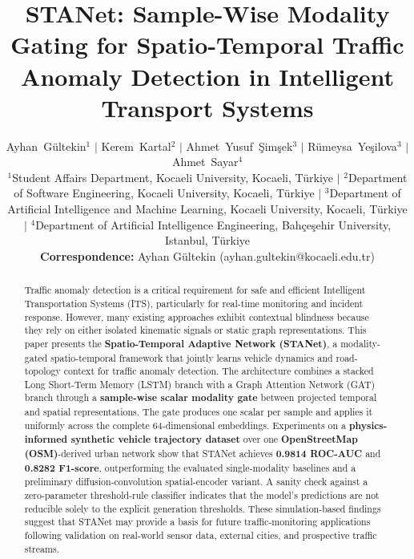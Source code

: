 \documentclass[journal]{IEEEtran}
\begin{document}
\raggedbottom

\title{STANet: Sample-Wise Modality Gating for Spatio-Temporal Traffic Anomaly Detection in Intelligent Transport Systems}

\author{
    Ayhan~Gültekin$^{1}$ $|$ Kerem~Kartal$^{2}$ $|$ Ahmet~Yusuf~Şimşek$^{3}$ $|$ Rümeysa~Yeşilova$^{3}$ $|$ Ahmet~Sayar$^{4}$ \\[2ex]
    \small
    $^{1}$Student Affairs Department, Kocaeli University, Kocaeli, Türkiye $|$
    $^{2}$Department of Software Engineering, Kocaeli University, Kocaeli, Türkiye $|$
    $^{3}$Department of Artificial Intelligence and Machine Learning, Kocaeli University, Kocaeli, Türkiye $|$
    $^{4}$Department of Artificial Intelligence Engineering, Bahçeşehir University, Istanbul, Türkiye \\[1.5ex]
    \textbf{Correspondence:} Ayhan Gültekin (ayhan.gultekin@kocaeli.edu.tr)
}

\maketitle

\begin{abstract}
  Traffic anomaly detection is a critical requirement for safe and efficient Intelligent Transportation Systems (ITS), particularly for real-time monitoring and incident response. However, many existing approaches exhibit contextual blindness because they rely on either isolated kinematic signals or static graph representations. This paper presents the \textbf{Spatio-Temporal Adaptive Network (STANet)}, a modality-gated spatio-temporal framework that jointly learns vehicle dynamics and road-topology context for traffic anomaly detection. The architecture combines a stacked Long Short-Term Memory (LSTM) branch with a Graph Attention Network (GAT) branch through a \textbf{sample-wise scalar modality gate} between projected temporal and spatial representations. The gate produces one scalar per sample and applies it uniformly across the complete 64-dimensional embeddings. Experiments on a \textbf{physics-informed synthetic vehicle trajectory dataset} over one \textbf{OpenStreetMap (OSM)}-derived urban network show that STANet achieves \textbf{0.9814 ROC-AUC} and \textbf{0.8282 F1-score}, outperforming the evaluated single-modality baselines and a preliminary diffusion-convolution spatial-encoder variant. A sanity check against a zero-parameter threshold-rule classifier indicates that the model's predictions are not reducible solely to the explicit generation thresholds. These simulation-based findings suggest that STANet may provide a basis for future traffic-monitoring applications following validation on real-world sensor data, external cities, and prospective traffic streams.
\end{abstract}
\end{document}
